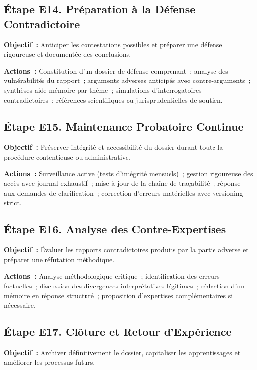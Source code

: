 \subsection{Étape E14. Préparation à la Défense Contradictoire}

\textbf{Objectif~:} Anticiper les contestations possibles et préparer une défense
rigoureuse et documentée des conclusions.

\textbf{Actions~:} Constitution d'un dossier de défense comprenant~: analyse
des vulnérabilités du rapport~; arguments adverses anticipés avec contre-arguments~;
synthèses aide-mémoire par thème~; simulations d'interrogatoires contradictoires~;
références scientifiques ou jurisprudentielles de soutien.

\subsection{Étape E15. Maintenance Probatoire Continue}

\textbf{Objectif~:} Préserver intégrité et accessibilité du dossier durant toute
la procédure contentieuse ou administrative.

\textbf{Actions~:} Surveillance active (tests d'intégrité mensuels)~;
gestion rigoureuse des accès avec journal exhaustif~;
mise à jour de la chaîne de traçabilité~;
réponse aux demandes de clarification~;
correction d'erreurs matérielles avec versioning strict.

\subsection{Étape E16. Analyse des Contre-Expertises}

\textbf{Objectif~:} Évaluer les rapports contradictoires produits par la partie
adverse et préparer une réfutation méthodique.

\textbf{Actions~:} Analyse méthodologique critique~;
identification des erreurs factuelles~;
discussion des divergences interprétatives légitimes~;
rédaction d'un mémoire en réponse structuré~;
proposition d'expertises complémentaires si nécessaire.

\subsection{Étape E17. Clôture et Retour d'Expérience}

\textbf{Objectif~:} Archiver définitivement le dossier, capitaliser les
apprentissages et améliorer les processus futurs.

